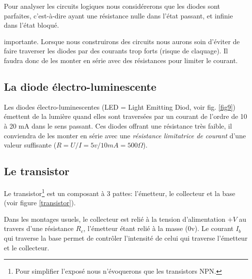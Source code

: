 Pour analyser les circuits logiques nous consid\'ererons que les diodes sont
parfaites, c'est-\`a-dire ayant une r\'esistance  nulle dans l'\'etat passant,
et infinie dans l'\'etat bloqu\'e.


\begin{remarque}{importante.} Lorsque nous construirons des circuits nous
aurons soin d'\'eviter de faire traverser les diodes par des courants trop 
forts (risque de claquage). Il faudra donc de les monter en s\'erie avec des
r\'esistances pour limiter le courant.
\end{remarque}

\subsection{La diode \'electro-luminescente}

Les diodes \'electro-luminescentes (LED = Light Emitting Diod, voir
fig. \ref{fig9}) émettent de la lumi\`ere quand elles sont
travers\'ees par un courant de l'ordre de 10 \`a 20 mA dans le sens
passant.  Ces diodes offrant une r\'esistance tr\`es faible, il
conviendra de les monter en série avec une {\em r\'esistance
limitatrice de courant} d'une valeur suffisante ($R=U/I=5v/10mA=500
\Omega$).





\subsection{Le transistor}



Le transistor\footnote{Pour simplifier l'expos\'e nous n'\'evoquerons
que les transistors NPN.}
 est un composant \`a 3 pattes: l'\'emetteur, le collecteur et la
base (voir figure \ref{transistor}).  




Dans les montages usuels, 
le collecteur est reli\'e \`a la tension d'alimentation $+V$ au travers d'une 
r\'esistance $R_c$, l'\'emetteur \'etant reli\'e \`a la masse (0v). Le courant $I_b$
qui traverse la base permet de contr\^oler l'intensit\'e de celui qui traverse
l'\'emetteur et le collecteur.



